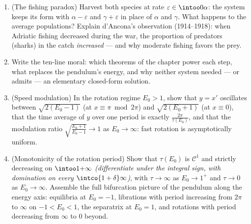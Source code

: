 \begin{problem}
\begin{enumerate}[resume]
  \item (The fishing paradox) Harvest both species at rate
        $\varepsilon \in \intoo0\alpha$: the system keeps
        its form with $\alpha - \varepsilon$ and $\gamma +
        \varepsilon$ in place of $\alpha$ and $\gamma$. What
        happens to the average populations? Explain
        d'Ancona's observation (1914--1918): when Adriatic
        fishing decreased during the war, the proportion of
        predators (sharks) in the catch \emph{increased} ---
        and why moderate fishing favors the prey.
  \item Write the ten-line moral: which theorems of the
        chapter power each step, what replaces the
        pendulum's energy, and why neither system needed ---
        or admits --- an elementary closed-form solution.

  \item (Speed modulation) In the rotation regime $E_0 > 1$,
        show that $y = x'$ oscillates between
        $\sqrt{2(E_0 - 1)}$ (at $x \equiv \pi \bmod 2\pi$)
        and $\sqrt{2(E_0 + 1)}$ (at $x \equiv 0$), that the
        time average of $y$ over one period is exactly
        $\frac{2\pi}{\tau(E_0)}$, and that the modulation
        ratio $\sqrt{\frac{E_0 + 1}{E_0 - 1}} \to 1$ as $E_0
        \to \infty$: fast rotation is asymptotically
        uniform.
  \item (Monotonicity of the rotation period) Show that
        $\tau(E_0)$ is $\mathcal C^1$ and strictly
        decreasing on $\intoo1{+\infty}$
        \emph{(differentiate under the integral sign, with
        domination on every $\intco{1 + \delta}\infty$)},
        with $\tau \to \infty$ as $E_0 \to 1^+$ and $\tau
        \to 0$ as $E_0 \to \infty$. Assemble the full
        bifurcation picture of the pendulum along the
        energy axis: equilibria at $E_0 = -1$, librations
        with period increasing from $2\pi$ to $\infty$ on
        $-1 < E_0 < 1$, the separatrix at $E_0 = 1$, and
        rotations with period decreasing from $\infty$ to
        $0$ beyond.
\end{enumerate}
\end{problem}
